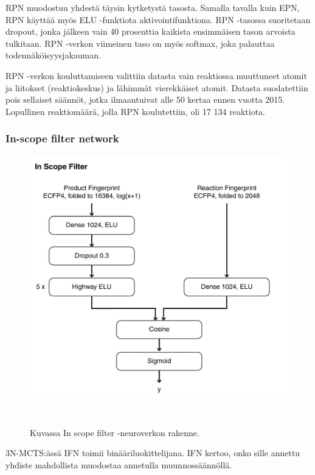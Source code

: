 \documentclass[finnish,twoside,censored,tkt,sw-line]{HYthesisML}
\begin{document}
RPN muodostuu yhdestä täysin kytketystä tasosta.
Samalla tavalla kuin EPN, RPN käyttää myös ELU -funktiota aktivointifunktiona.
RPN -tasossa suoritetaan dropout, jonka jälkeen vain 40 prosenttia kaikista ensimmäisen tason arvoista tulkitaan.
RPN -verkon viimeinen taso on myös softmax, joka palauttaa todennäköisyysjakauman.

RPN -verkon kouluttamiseen valittiin datasta vain reaktiossa muuttuneet atomit ja liitokset (reaktiokeskus) ja lähimmät vierekkäiset atomit.
Datasta suodatettiin pois sellaiset säännöt, jotka ilmaantuivat alle 50 kertaa ennen vuotta 2015.
Lopullinen reaktiomäärä, jolla RPN koulutettiin, oli 17 134 reaktiota.

\subsubsection{In-scope filter network}

\begin{figure}[ht]
    \centering
    \includegraphics[]{in-scope-filter.jpg}
    \caption{Kuvassa In scope filter -neuroverkon rakenne.}
    {~\cite{SeglerMarwinHS2018Pcsw}}
\end{figure}


3N-MCTS:ässä IFN toimii binääriluokittelijana.
IFN kertoo, onko sille annettu yhdiste mahdollista muodostaa annetulla muunnossäännöllä.
\end{document}
